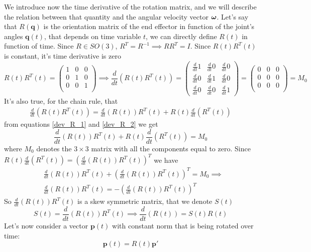 \documentclass[10pt, letterpaper]{report}
\begin{document}
We introduce now the time derivative of the rotation matrix, and we will describe the relation between that quantity and the angular velocity vector ${\boldsymbol{\omega}}$. Let's say that $R(\mathbf q)$ is the orientation matrix of the end effector in function of the joint's angles $\mathbf q(t)$, that depends on time variable $t$, we can directly define $R(t)$ in function of time. Since $R\in SO(3)$, $R^T=R^{-1}\implies RR^T=I$. Since $R(t)R^T(t)$ is constant, it's time derivative is zero\begin{equation}\label{dev_R_1}
    R(t)R^T(t)=\begin{pmatrix}
        1&0&0\\
        0&1&0\\
        0&0&1\\
    \end{pmatrix}\implies \frac{d}{dt}(R(t)R^T(t)) = \begin{pmatrix}
        \frac{d}{dt}1&\frac{d}{dt}0&\frac{d}{dt}0\\
        \frac{d}{dt}0&\frac{d}{dt}1&\frac{d}{dt}0\\
        \frac{d}{dt}0&\frac{d}{dt}0&\frac{d}{dt}1
    \end{pmatrix}=\begin{pmatrix}
        0&0&0\\
        0&0&0\\
        0&0&0\\
    \end{pmatrix}=M_0
\end{equation}
It's also true, for the chain rule, that\begin{align}\label{dev_R_2}
     \frac{d}{dt}(R(t)R^T(t))= \frac{d}{dt}(R(t))R^T(t)+R(t)\frac{d}{dt}(R^T(t))
\end{align}
from equations \eqref{dev_R_1} and \eqref{dev_R_2} we get\begin{equation}
     \frac{d}{dt}(R(t))R^T(t)+R(t)\frac{d}{dt}(R^T(t))=M_0
\end{equation}
where $M_0$ denotes the $3\times 3$ matrix with all the components equal to zero. Since $R(t)\frac{d}{dt}(R^T(t))=(\frac{d}{dt}(R(t))R^T(t))^T$ we have \begin{align}
    &\frac{d}{dt}(R(t))R^T(t)+(\frac{d}{dt}(R(t))R^T(t))^T=M_0\implies\\ 
    &\frac{d}{dt}(R(t))R^T(t)=-(\frac{d}{dt}(R(t))R^T(t))^T
\end{align}
So $\frac{d}{dt}(R(t))R^T(t)$ is a skew symmetric matrix, that we denote $S(t)$\begin{equation}\label{time_skew}
S(t)=\frac{d}{dt}(R(t))R^T(t)\implies \frac{d}{dt}(R(t))=S(t)R(t)
\end{equation} Let's now consider a vector $\mathbf p(t)$ with constant norm that is being rotated over time:\begin{equation}
    \mathbf p(t)=R(t)\mathbf p'
\end{equation}
\end{document}
